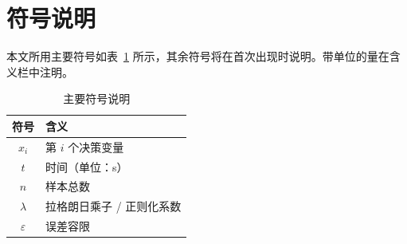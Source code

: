 \section{符号说明}

本文所用主要符号如表~\ref{tab:notation} 所示，其余符号将在首次出现时说明。带单位的量在含义栏中注明。

\begin{table}[H]
    \centering
    \caption{主要符号说明}
    \label{tab:notation}
    \begin{tabular}{@{}cl@{}}
        \toprule
        符号 & 含义 \\
        \midrule
        $x_i$         & 第 $i$ 个决策变量 \\
        $t$           & 时间（单位：\si{\second}） \\
        $n$           & 样本总数 \\
        $\lambda$     & 拉格朗日乘子 / 正则化系数 \\
        $\varepsilon$ & 误差容限 \\
        \bottomrule
    \end{tabular}
\end{table}
